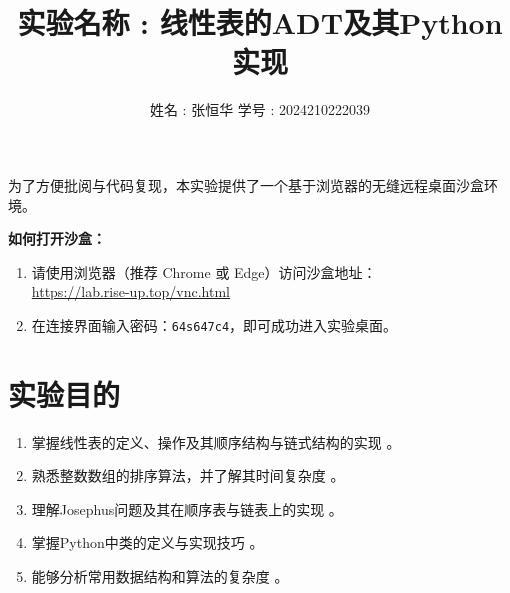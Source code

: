 \documentclass[12pt,a4paper]{ctexart}
\title{\vspace{-2cm} \textbf{实验名称 : 线性表的ADT及其Python实现}}
\author{姓名 : 张恒华 \quad 学号 : 2024210222039}
\begin{document}
	
	\maketitle
	
	\begin{tcolorbox}[colback=gray!5,colframe=gray!50!black,title=\textbf{实验复现沙盒使用提示}]
		为了方便批阅与代码复现，本实验提供了一个基于浏览器的无缝远程桌面沙盒环境。
		
		\textbf{如何打开沙盒：}
		\begin{enumerate}
			\item 请使用浏览器（推荐 Chrome 或 Edge）访问沙盒地址：\\
			\url{https://lab.rise-up.top/vnc.html}
			\item 在连接界面输入密码：\texttt{64s647c4}，即可成功进入实验桌面。
		\end{enumerate}
	\end{tcolorbox}
	
	\vspace{1em}
	
	\section{实验目的}
	\begin{enumerate}
		\item 掌握线性表的定义、操作及其顺序结构与链式结构的实现 。
		\item 熟悉整数数组的排序算法，并了解其时间复杂度 。
		\item 理解Josephus问题及其在顺序表与链表上的实现 。
		\item 掌握Python中类的定义与实现技巧 。
		\item 能够分析常用数据结构和算法的复杂度 。
	\end{enumerate}
	
\end{document}
